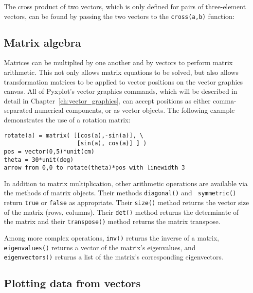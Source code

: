 \vspace{3mm}

\vspace{3mm}

\noindent
The cross product of two vectors, which is only defined for pairs of three-element vectors, can be found by passing the two vectors to the {\tt cross(a,b)} function:

\vspace{3mm}

\vspace{3mm}


\subsection{Matrix algebra}

Matrices can be multiplied by one another and by vectors to perform matrix
arithmetic. This not only allows matrix equations to be solved, but also allows
transformation matrices to be applied to vector positions on the vector
graphics canvas. All of Pyxplot's vector graphics commands, which will be
described in detail in Chapter~\ref{ch:vector_graphics}, can accept positions
as either comma-separated numerical components, or as vector objects. The
following example demonstrates the use of a rotation matrix:

\begin{verbatim}
rotate(a) = matrix( [[cos(a),-sin(a)], \
                     [sin(a), cos(a)] ] )
pos = vector(0,5)*unit(cm)
theta = 30*unit(deg)
arrow from 0,0 to rotate(theta)*pos with linewidth 3
\end{verbatim}

In addition to matrix multiplication, other arithmetic operations are available
via the methods of matrix objects. Their methods {\tt diagonal()} and {\tt
symmetric()} return {\tt true} or {\tt false} as appropriate. Their {\tt size()}
method returns the vector size of the matrix (rows, columns). Their {\tt det()}
method returns the determinate of the matrix and their {\tt transpose()} method
returns the matrix transpose.

Among more complex operations, {\tt inv()} returns the inverse of a matrix,
{\tt eigen\-values()} returns a vector of the matrix's eigen\-values, and {\tt
eigen\-vectors()} returns a list of the matrix's corresponding eigen\-vectors.

\subsection{Plotting data from vectors}
\label{sec:vectorplot}

